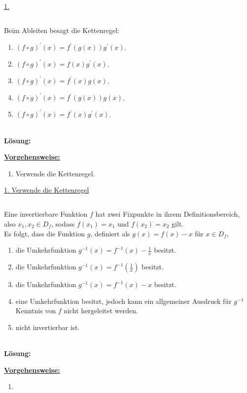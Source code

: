 \underline{1. }\\



 \newpage

\subsection*{}
Beim Ableiten besagt die Kettenregel:
\renewcommand{\labelenumi}{(\alph{enumi})}
\begin{enumerate}
	\item 
	$ (f \circ g)^\prime(x) = f^\prime(g(x)) g^\prime(x)$.
	\item 
	$ (f \circ g)^\prime(x) = f(x) g^\prime(x)$.
	\item
	$ (f \circ g)^\prime(x) = f^\prime(x) g(x)$.
	\item
	$ (f \circ g)^\prime(x) = f^\prime(g(x)) g(x)$.
	\item
	$ (f \circ g)^\prime(x) = f^\prime(x) g^\prime(x)$.
\end{enumerate}
\ \\
\textbf{Lösung:}
\begin{mdframed}
\underline{\textbf{Vorgehensweise:}}
\renewcommand{\labelenumi}{\theenumi.}
\begin{enumerate}
\item Verwende die Kettenregel.
\end{enumerate}
\end{mdframed}

\underline{1. Verwende die Kettenregel}\\

 


\newpage
\subsection*{}
Eine invertierbare Funktion $f$ hat zwei Fixpunkte in ihrem Definitionsbereich, also $x_1,x_2 \in D_f$, sodass $f(x_1) = x_1$ und $f(x_2) = x_2$ gilt.\\
Es folgt, dass die Funktion $g$, definiert als $g(x) = f(x) - x$ für $x \in D_f$,
\renewcommand{\labelenumi}{(\alph{enumi})}
\begin{enumerate}
	\item 
	die Umkehrfunktion $g^{-1}(x) = f^{-1}(x) - \frac{1}{x} $ besitzt.
	\item
	die Umkehrfunktion $g^{-1}(x) = f^{-1}\left(\frac{1}{x}\right) $ besitzt.
	\item
	die Umkehrfunktion $g^{-1}(x) = f^{-1}(x) - x $ besitzt.
	\item
	eine Umkehrfunktion besitzt, jedoch kann ein allgemeiner Ausdruck für $g^{-1} $ Kenntnis von $f$ nicht hergeleitet werden.
	\item
	nicht invertierbar ist.
\end{enumerate}
\ \\
\textbf{Lösung:}
\begin{mdframed}
\underline{\textbf{Vorgehensweise:}}
\renewcommand{\labelenumi}{\theenumi.}
\begin{enumerate}
\item 
\end{enumerate}
\end{mdframed}

